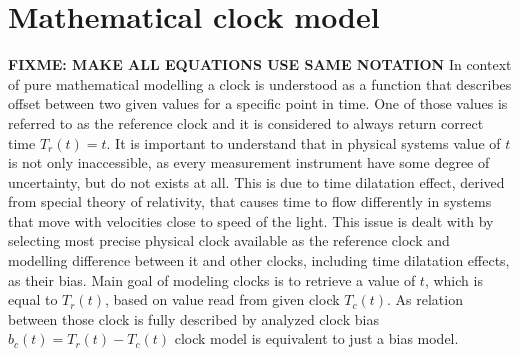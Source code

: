 \section{Mathematical clock model}
\textbf{FIXME: MAKE ALL EQUATIONS USE SAME NOTATION}
In context of pure mathematical modelling a clock is understood as a function that describes
offset between two given values for a specific point in time. One of those values is referred 
to as the reference clock and it is considered to always return correct time $T_{r}(t)=t$.
It is important to understand that in physical systems value of $t$ is not only inaccessible, as
every measurement instrument have some degree of uncertainty, but do not exists at all.
This is due to time dilatation effect, derived from special theory of relativity, that causes
time to flow differently in systems that move with velocities close to speed of the light.
This issue is dealt with by selecting most precise physical clock available as the reference
clock and modelling difference between it and other clocks, including time dilatation effects,
as their bias.
Main goal of modeling clocks is to retrieve a value of $t$, which is equal to $T_{r}(t)$, based
on value read from given clock $T_{c}(t)$. 
As relation between those clock is fully described by analyzed clock bias 
$b_{c}(t)=T_{r}(t)-T_{c}(t)$ clock model is equivalent to just a bias model.

